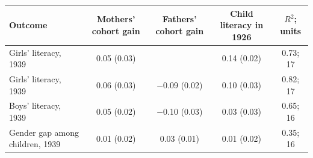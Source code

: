 \begin{tabular}{lcccc}
\toprule
Outcome & Mothers' cohort gain & Fathers' cohort gain & Child literacy in 1926 & $R^2$; units \\
\midrule
Girls' literacy, 1939 & 0.05 (0.03) & & 0.14 (0.02) & 0.73; 17 \\
Girls' literacy, 1939 & 0.06 (0.03) & $-$0.09 (0.02) & 0.10 (0.03) & 0.82; 17 \\
Boys' literacy, 1939 & 0.05 (0.02) & $-$0.10 (0.03) & 0.03 (0.03) & 0.65; 16 \\
Gender gap among children, 1939 & 0.01 (0.02) & 0.03 (0.01) & 0.01 (0.02) & 0.35; 16 \\
\bottomrule
\end{tabular}
